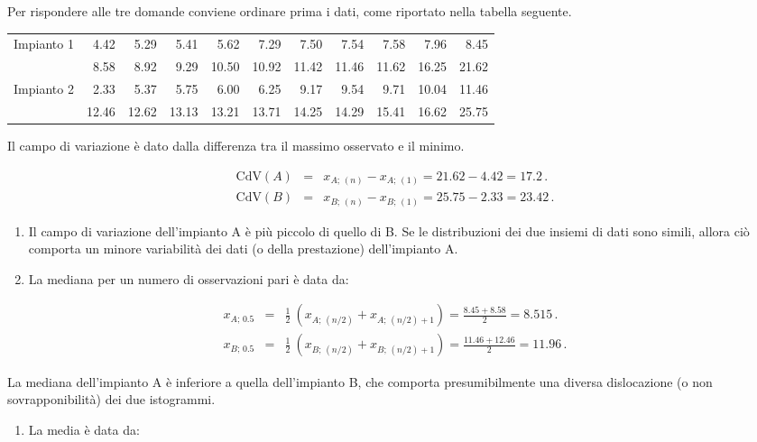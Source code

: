 \documentclass[
  11pt,
]{book}
\providecommand{\tightlist}{%
  \setlength{\itemsep}{0pt}\setlength{\parskip}{0pt}}
\theoremstyle{mytheoremstyle}
\theoremstyle{mydefstyle}
\newenvironment{sol}
  {
  \begin{tcolorbox}[enhanced,breakable,arc=0.1mm,boxrule=1pt,colback=white,colframe=iblue,
  title=\bf \fontfamily{lmss}\selectfont \hspace{.5 cm} Soluzione,drop fuzzy shadow]

}{
\end{tcolorbox}
  }
\begin{document}
\begin{sol}
Per rispondere alle tre domande conviene ordinare prima i dati, come
riportato nella tabella seguente.

\begin{tabular}{lrrrrrrrrrr}
\toprule
Impianto 1 & 4.42 & 5.29 & 5.41 & 5.62 & 7.29 & 7.50 & 7.54 & 7.58 & 7.96 & 8.45\\
 & 8.58 & 8.92 & 9.29 & 10.50 & 10.92 & 11.42 & 11.46 & 11.62 & 16.25 & 21.62\\
Impianto 2 & 2.33 & 5.37 & 5.75 & 6.00 & 6.25 & 9.17 & 9.54 & 9.71 & 10.04 & 11.46\\
 & 12.46 & 12.62 & 13.13 & 13.21 & 13.71 & 14.25 & 14.29 & 15.41 & 16.62 & 25.75\\
\bottomrule
\end{tabular}

Il campo di variazione è dato dalla differenza tra il massimo osservato
e il minimo.

\begin{eqnarray*}
\mbox{CdV}(A) &=& x_{A;\, (n)} - x_{A;\, (1)} = 21.62 - 4.42 = 17.2 \,. \\
\mbox{CdV}(B) &=& x_{B;\, (n)} - x_{B;\, (1)} = 25.75 - 2.33 = 23.42 \,.
\end{eqnarray*}

\begin{enumerate}
\def\labelenumi{\alph{enumi}.}
\item
  Il campo di variazione dell'impianto A è più piccolo di quello di B.
  Se le distribuzioni dei due insiemi di dati sono simili, allora ciò
  comporta un minore variabilità dei dati (o della prestazione)
  dell'impianto A.
\item
  La mediana per un numero di osservazioni pari è data da:
\end{enumerate}

\begin{eqnarray*}
x_{A;\, 0.5} &=& \frac{1} {2}\ \left( x_{A;\, (n/2)} + x_{A;\, (n/2)+1} \right)
              =  \frac{8.45 + 8.58} {2} = 8.515 \,. \\
x_{B;\, 0.5} &=& \frac{1} {2}\ \left( x_{B;\, (n/2)} + x_{B;\, (n/2)+1} \right)
              =  \frac{11.46 + 12.46} {2} = 11.96 \,.
\end{eqnarray*}

La mediana dell'impianto A è inferiore a quella dell'impianto B,
che comporta presumibilmente una diversa dislocazione (o non
sovrapponibilità) dei due istogrammi.

\begin{enumerate}
\def\labelenumi{\alph{enumi}.}
\setcounter{enumi}{2}
\tightlist
\item
  La media è data da:
\end{enumerate}


\end{sol}
\end{document}
